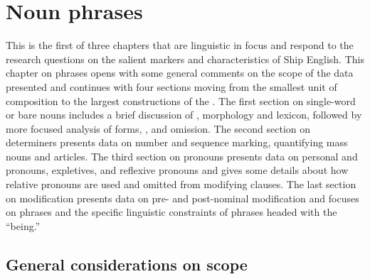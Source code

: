 \chapter{{Noun phrases}}

This is the first of three chapters that are linguistic in focus and respond to the research questions on the salient markers and characteristics of Ship English. This chapter on  phrases opens with some general comments on the scope of the data presented and continues with four sections moving from the smallest unit of  composition to the largest constructions of the . The first section on single-word or bare nouns includes a brief discussion of , morphology and lexicon, followed by more focused analysis of  forms, , and  omission. The second section on determiners presents data on number and sequence marking, quantifying mass nouns and articles. The third section on pronouns presents data on personal and  pronouns, expletives,  and reflexive pronouns and gives some details about how relative pronouns are used and omitted from modifying clauses. The last section on  modification presents data on pre- and post-nominal modification and focuses on  phrases and the specific linguistic constraints of phrases headed with the  “being.” 

\section{{General considerations on scope}}\label{sec:5.1}

